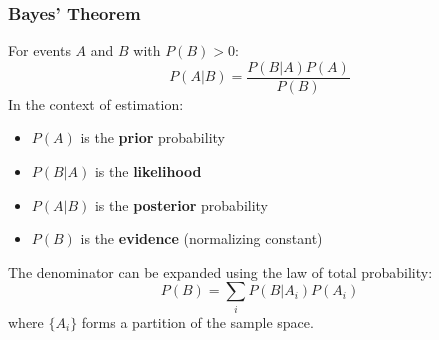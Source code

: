 \subsubsection{Bayes' Theorem}

\begin{keyconceptbox}[title=Bayes' Theorem]
For events $A$ and $B$ with $P(B) > 0$:
\begin{equation}
P(A|B) = \frac{P(B|A)P(A)}{P(B)}
\label{eq:bayes_theorem}
\end{equation}
In the context of estimation:
\begin{itemize}
    \item $P(A)$ is the \textbf{prior} probability
    \item $P(B|A)$ is the \textbf{likelihood}
    \item $P(A|B)$ is the \textbf{posterior} probability
    \item $P(B)$ is the \textbf{evidence} (normalizing constant)
\end{itemize}
\end{keyconceptbox}

The denominator can be expanded using the law of total probability:
\begin{equation}
P(B) = \sum_i P(B|A_i)P(A_i)
\end{equation}
where $\{A_i\}$ forms a partition of the sample space.



